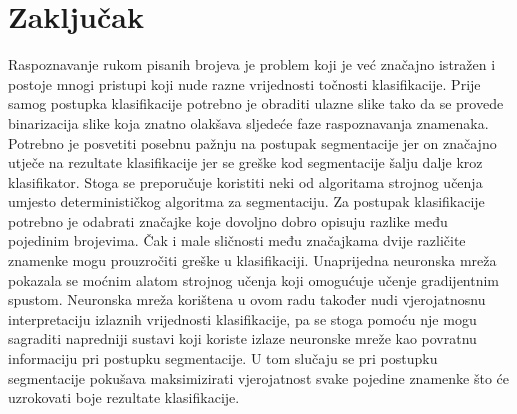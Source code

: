 \chapter{Zaključak}
\label{ch:zakljucak}
Raspoznavanje rukom pisanih brojeva je problem koji je već značajno istražen i postoje mnogi pristupi koji nude razne
vrijednosti točnosti klasifikacije. Prije samog postupka klasifikacije potrebno je obraditi ulazne slike tako da se
provede binarizacija slike koja znatno olakšava sljedeće faze raspoznavanja znamenaka. Potrebno je posvetiti posebnu
pažnju na postupak segmentacije jer on značajno utječe na rezultate klasifikacije jer se greške kod segmentacije šalju
dalje kroz klasifikator. Stoga se preporučuje koristiti neki od algoritama strojnog učenja umjesto determinističkog
algoritma za segmentaciju. Za postupak klasifikacije potrebno je odabrati značajke koje dovoljno dobro opisuju razlike
među pojedinim brojevima. Čak i male sličnosti među značajkama dvije različite znamenke mogu prouzročiti greške u
klasifikaciji. Unaprijedna neuronska mreža pokazala se moćnim alatom strojnog učenja koji omogućuje učenje gradijentnim
spustom. Neuronska mreža korištena u ovom radu također nudi vjerojatnosnu interpretaciju izlaznih vrijednosti
klasifikacije, pa se stoga pomoću nje mogu sagraditi napredniji sustavi koji koriste izlaze neuronske mreže kao povratnu
informaciju pri postupku segmentacije. U tom slučaju se pri postupku segmentacije pokušava maksimizirati vjerojatnost
svake pojedine znamenke što će uzrokovati boje rezultate klasifikacije.
